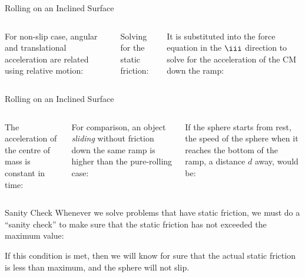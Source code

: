 \documentclass[12pt,compress,aspectratio=169]{beamer}
\begin{document}
\begin{frame}{Rolling on an Inclined Surface}
  \begin{columns}
    

    For non-slip case, angular and translational acceleration are related using
    relative motion:

    
    \vspace{-.22in}Solving for the static friction:


    \vspace{-.1in}It is substituted into the force equation in the $\iii$
    direction to solve for the acceleration of the CM down the ramp:

  \end{columns}
\end{frame}



\begin{frame}{Rolling on an Inclined Surface}
  \begin{columns}
    

    The acceleration of the centre of mass is constant in time:


    \vspace{-.1in}For comparison, an object \emph{sliding} without friction
    down the same ramp is higher than the pure-rolling case:
    
    
    \vspace{-.2in}If the sphere starts from rest, the speed of the sphere when
    it reaches the bottom of the ramp, a distance $d$ away, would be:

  \end{columns}
\end{frame}


\begin{frame}[t]{Sanity Check}
  Whenever we solve problems that have static friction, we must do a
  ``sanity check'' to make sure that the static friction has not exceeded the
  maximum value:

  
  \vspace{1.3in}
  If this condition is met, then we will know for sure that the actual static
  friction is less than maximum, and the sphere will not slip.
\end{frame}
\end{document}
